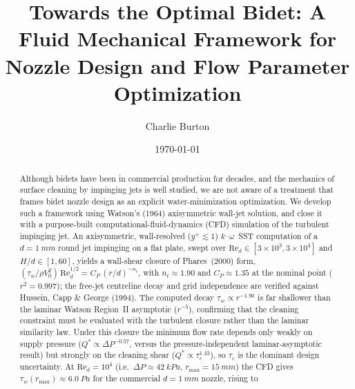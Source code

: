 \documentclass[aps,prfluids,reprint,amsmath,amssymb,floatfix]{revtex4-2}
\newcommand{\Rey}{\mathrm{Re}}
\begin{document}
\title{Towards the Optimal Bidet: A Fluid Mechanical Framework
  for Nozzle Design and Flow Parameter Optimization}

\author{Charlie Burton}

\date{\today}

\begin{abstract}
Although bidets have been in commercial production for decades, and the
mechanics of surface cleaning by impinging jets is well studied, we are not
aware of a treatment that frames bidet nozzle design as an explicit
water-minimization optimization. We develop such a framework using Watson's
(1964) axisymmetric wall-jet solution, and close it with a purpose-built
computational-fluid-dynamics (CFD) simulation of the turbulent impinging jet.
An axisymmetric, wall-resolved ($y^+ \lesssim 1$) $k$--$\omega$~SST computation
of a $d = \SI{1}{mm}$ round jet impinging on a flat plate, swept over
$\Rey_d \in [3\times 10^3, 3\times 10^4]$ and $H/d \in [1, 60]$, yields a
wall-shear closure of Phares~(2000) form,
$(\tau_w/\rho V_0^2)\,\Rey_d^{1/2} = C_P\,(r/d)^{-n_t}$, with
$n_t \approx 1.90$ and $C_P \approx 1.35$ at the nominal point
($r^2 = 0.997$); the free-jet centreline decay and grid independence are
verified against Hussein, Capp \& George (1994). The computed decay
$\tau_w \propto r^{-1.90}$ is far shallower than the laminar Watson
Region~II asymptotic ($r^{-5}$), confirming that the cleaning constraint
must be evaluated with the turbulent closure rather than the laminar
similarity law. Under this closure the minimum flow rate depends only weakly
on supply pressure ($Q^* \propto \Delta P^{-0.57}$, versus the
pressure-independent laminar-asymptotic result) but strongly on the cleaning
shear ($Q^* \propto \tau_c^{1.43}$), so $\tau_c$ is the dominant design
uncertainty. At $\Rey_d = 10^4$ (i.e.\ $\Delta P \approx \SI{42}{kPa}$,
$r_\mathrm{max} = \SI{15}{mm}$) the CFD gives $\tau_w(r_\mathrm{max}) \approx
\SI{6.0}{Pa}$ for the commercial $d = \SI{1}{mm}$ nozzle, rising to

\end{abstract}
\end{document}
